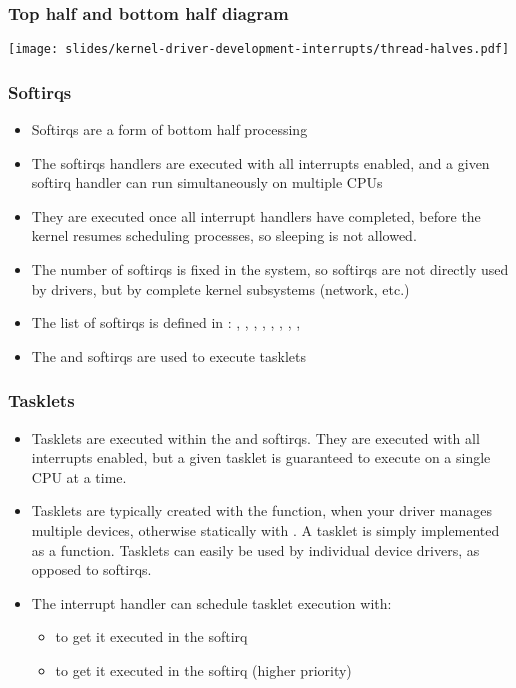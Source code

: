 \begin{frame}
  \frametitle{Top half and bottom half diagram}
  \begin{center}
    \texttt{[image: slides/kernel-driver-development-interrupts/thread-halves.pdf]}
  \end{center}
\end{frame}

\begin{frame}
  \frametitle{Softirqs}
  \begin{itemize}
  \item Softirqs are a form of bottom half processing
  \item The softirqs handlers are executed with all interrupts
    enabled, and a given softirq handler can run simultaneously on
    multiple CPUs
  \item They are executed once all interrupt handlers have completed,
    before the kernel resumes scheduling processes, so sleeping is not
    allowed.
  \item The number of softirqs is fixed in the system, so softirqs are
    not directly used by drivers, but by complete kernel subsystems
    (network, etc.)
  \item The list of softirqs is defined in
    : , 
    , , ,
    , ,
    , , 
  \item The  and  softirqs are used to execute
    tasklets
  \end{itemize}
\end{frame}

\begin{frame}
  \frametitle{Tasklets}
  \begin{itemize}
  \item Tasklets are executed within the  and
     softirqs. They are executed with all interrupts enabled, but a
    given tasklet is guaranteed to execute on a single CPU at a time.
  \item Tasklets are typically created with the 
    function, when your driver manages multiple devices, otherwise
    statically with . A tasklet is simply
    implemented as a function. Tasklets can easily
    be used by individual device drivers, as opposed to softirqs.
  \item The interrupt handler can schedule tasklet execution with:
    \begin{itemize}
    \item {} to get it executed in the
       softirq
    \item {} to get it executed in the
       softirq (higher priority)
    \end{itemize}
  \end{itemize}
\end{frame}

